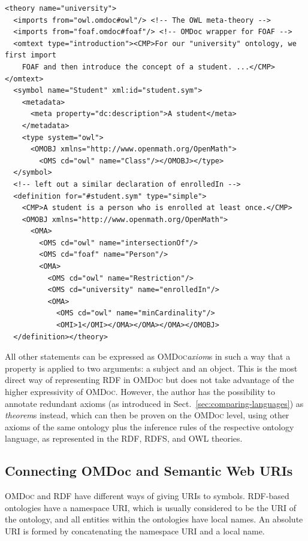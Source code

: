 \documentclass{llncs}
\renewcommand{\omdoc}{\textsc{OMDoc}\xspace}
\begin{document}
\begin{lstlisting}[caption={An OWL ontology in {\omdoc}: class
  definition and documentation},label=fig:class-def]
<theory name="university">
  <imports from="owl.omdoc#owl"/> <!-- The OWL meta-theory -->
  <imports from="foaf.omdoc#foaf"/> <!-- OMDoc wrapper for FOAF -->
  <omtext type="introduction"><CMP>For our "university" ontology, we first import
    FOAF and then introduce the concept of a student. ...</CMP></omtext>
  <symbol name="Student" xml:id="student.sym">
    <metadata>
      <meta property="dc:description">A student</meta>
    </metadata>
    <type system="owl">
      <OMOBJ xmlns="http://www.openmath.org/OpenMath">
        <OMS cd="owl" name="Class"/></OMOBJ></type>
  </symbol>
  <!-- left out a similar declaration of enrolledIn -->
  <definition for="#student.sym" type="simple">
    <CMP>A student is a person who is enrolled at least once.</CMP>
    <OMOBJ xmlns="http://www.openmath.org/OpenMath">
      <OMA>
        <OMS cd="owl" name="intersectionOf"/>
        <OMS cd="foaf" name="Person"/>
        <OMA>
          <OMS cd="owl" name="Restriction"/>
          <OMS cd="university" name="enrolledIn"/>
          <OMA>
            <OMS cd="owl" name="minCardinality"/>
            <OMI>1</OMI></OMA></OMA></OMA></OMOBJ>
  </definition></theory>
\end{lstlisting}
All other statements can be expressed as \omdoc \emph{axiom}s in such a way that a
property is applied to two arguments: a subject and an object.  This is the most direct
way of representing RDF in \omdoc but does not take advantage of the higher expressivity
of \omdoc.  However, the author has the possibility to annotate redundant axioms (as
introduced in Sect.~\ref{sec:comparing-languages}) as \textit{theorem}s instead, which can
then be proven on the \omdoc level, using other axioms of the same ontology plus the
inference rules of the respective ontology language, as represented in the RDF, RDFS, and
OWL theories.

\subsection{Connecting OMDoc and Semantic Web URIs}\label{sec:uris}

\omdoc and RDF have different ways of giving URIs to symbols.  RDF-based
ontologies have a namespace URI, which is usually considered to be the URI of
the ontology, and all entities within the ontologies have local names.  An
absolute URI is formed by concatenating the namespace URI and a local name.
\end{document}
